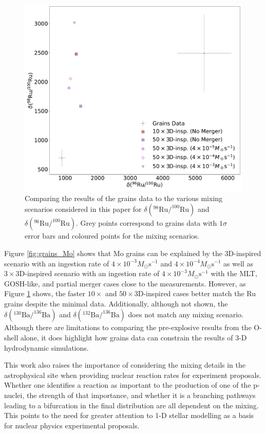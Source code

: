 \begin{figure}[!htbp]
\includegraphics[width=\textwidth]{chapters/2/figures/grains_Ru96_Ru98_Ru100.pdf}
\caption{Comparing the results of the grains data to the various mixing scenarios considered in this paper for $\delta(^{98}\mathrm{Ru}/^{100}\mathrm{Ru})$ and $\delta(^{96}\mathrm{Ru}/^{100}\mathrm{Ru})$. Grey points correspond to grains data with $1\sigma$ error bars and coloured points for the mixing scenarios.
\label{fig:grains_Ru}}
\end{figure}
Figure \ref{fig:grains_Mo} shows that Mo grains can be explained by the 3D-inspired scenario with an ingestion rate of $4\times10^{-3}M_\odot \mathrm{s}^{-1}$ and $4\times10^{-4}M_\odot\mathrm{s}^{-1}$ as well as $3\times$3D-inspired scenario with an ingestion rate of $4\times10^{-3}M_\odot\mathrm{s}^{-1}$ with the MLT, GOSH-like, and partial merger cases close to the measurements.
However, as Figure \ref{fig:grains_Ru} shows, the faster $10\times$ and $50\times$3D-inspired cases better match the Ru grains despite the minimal data.
Additionally, although not shown, the $\delta(^{130}\mathrm{Ba}/^{136}\mathrm{Ba})$ and $\delta(^{132}\mathrm{Ba}/^{136}\mathrm{Ba})$ does not match any mixing scenario.
Although there are limitations to comparing the pre-explosive results from the O-shell alone, it does highlight how grains data can constrain the results of 3-D hydrodynamic simulations.

This work also raises the importance of considering the mixing details in the astrophysical site when providing nuclear reaction rates for experiment proposals.
Whether one identifies a reaction as important to the production of one of the p-nuclei, the strength of that importance, and whether it is a branching pathways leading to a bifurcation in the final distribution are all dependent on the mixing.
This points to the need for greater attention to 1-D stellar modelling as a basis for nuclear physics experimental proposals.

